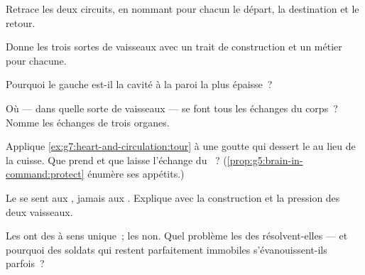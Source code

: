 \begin{exercise}[$\star$]\label{exo:g7:heart-and-circulation:3}
Retrace les deux circuits, en nommant pour chacun le départ, la
destination et le retour.
\end{exercise}

\begin{exercise}[$\star$]\label{exo:g7:heart-and-circulation:4}
Donne les trois sortes de vaisseaux avec un trait de construction et
un métier pour chacune.
\end{exercise}

\begin{exercise}[$\star$]\label{exo:g7:heart-and-circulation:5}
Pourquoi le  gauche est-il la cavité à la paroi la plus
épaisse~?
\end{exercise}

\begin{exercise}[$\star$]\label{exo:g7:heart-and-circulation:6}
Où --- dans quelle sorte de vaisseaux --- se font tous les échanges
du corps~? Nomme les échanges  de trois organes.
\end{exercise}

\begin{exercise}[$\star\star$]\label{exo:g7:heart-and-circulation:7}
Applique \cref{ex:g7:heart-and-circulation:tour} à une goutte qui
dessert le  au lieu de la cuisse. Que prend et que laisse
l'échange  du ~?
(\cref{prop:g5:brain-in-command:protect} énumère ses appétits.)
\end{exercise}

\begin{exercise}[$\star\star$]\label{exo:g7:heart-and-circulation:8}
Le  se sent aux , jamais aux . Explique avec la
construction et la pression des deux vaisseaux.
\end{exercise}

\begin{exercise}[$\star\star$]\label{exo:g7:heart-and-circulation:9}
Les  ont des  à sens unique~; les  non. Quel
problème les  des  résolvent-elles --- et pourquoi des
soldats qui restent parfaitement immobiles s'évanouissent-ils
parfois~?
\end{exercise}

